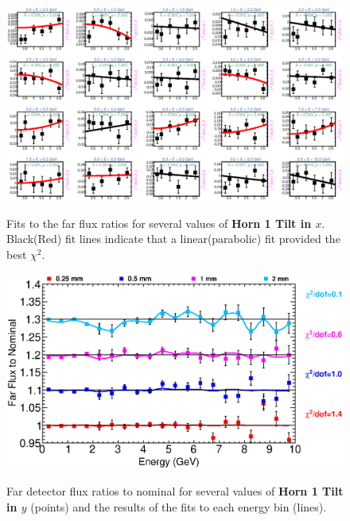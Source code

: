 {\begin{figure}[ht]
  \begin{center}
    {\includegraphics[width=5.0in]{figures/Horn1XTilt_far_fits.eps}}
  \end{center}
\caption{ Fits to the far flux ratios for several values of {\bf Horn 1 Tilt in $x$}. Black(Red) fit lines indicate that a linear(parabolic) fit provided the best $\chi^2$. }
\end{figure}

\begin{figure}[ht]
  \begin{center}
    {\includegraphics[width=6.0in]{figures/Horn1YTilt_far_summary.eps}}
  \end{center}
\caption{ Far detector flux ratios to nominal for several values of {\bf Horn 1 Tilt in $y$} (points) and the results of the fits to each energy bin (lines).}
\end{figure}

}
